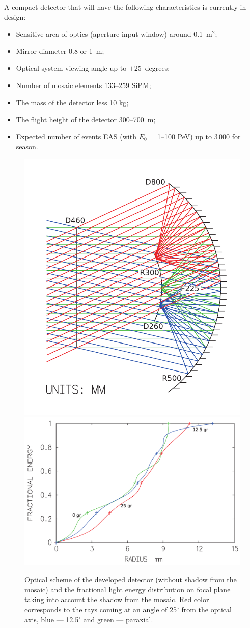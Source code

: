 \documentclass[a4paper,11pt]{article}
\begin{document}
A compact detector that will have the following characteristics is currently in design:

\begin{itemize}
\item Sensitive area of optics (aperture input window) around 0.1~m$^2$;
\item Mirror diameter 0.8 or 1~m;
\item Optical system viewing angle up to $\pm$25~degrees;
\item Number of mosaic elements 133--259 SiPM;
\item The mass of the detector less 10 kg;
\item The flight height of the detector 300--700~m;
\item Expected number of events EAS (with $E_0$ = 1--100 PeV) up to 3\,000 for season.
\end{itemize}

\begin{figure}[bt]
\centering %
\includegraphics[width=.32\textwidth,clip]{Sphere3optic.pdf}
\qquad
\includegraphics[width=.55\textwidth]{Sphere3spot_energy.pdf}
\caption{Optical scheme of the developed detector (without shadow from the mosaic) and the fractional light energy distribution on focal plane taking into account the shadow from the mosaic. Red color corresponds to the rays coming at an angle of 25$^\circ$ from the optical axis, blue --- 12.5$^\circ$ and green --- paraxial.}
\label{fig:optic_sphere3}
\end{figure}
\end{document}
